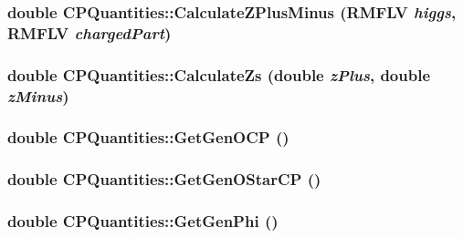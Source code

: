 \label{classCPQuantities_a75ee8a45a17843c7bff05190732a7bb4}
\hypertarget{classCPQuantities_a7bdaec07de8627dd1424946e7776768c}{
\subsubsection[{CalculateZPlusMinus}]{\setlength{\rightskip}{0pt plus 5cm}double CPQuantities::CalculateZPlusMinus (RMFLV {\em higgs}, \/  RMFLV {\em chargedPart})}}
\label{classCPQuantities_a7bdaec07de8627dd1424946e7776768c}
\hypertarget{classCPQuantities_a30852bb8fd044b8b6c979150aa1c5e84}{
\subsubsection[{CalculateZs}]{\setlength{\rightskip}{0pt plus 5cm}double CPQuantities::CalculateZs (double {\em zPlus}, \/  double {\em zMinus})}}
\label{classCPQuantities_a30852bb8fd044b8b6c979150aa1c5e84}
\hypertarget{classCPQuantities_a39840af1718044f5c19a0dbd42d314e7}{
\subsubsection[{GetGenOCP}]{\setlength{\rightskip}{0pt plus 5cm}double CPQuantities::GetGenOCP ()}}
\label{classCPQuantities_a39840af1718044f5c19a0dbd42d314e7}
\hypertarget{classCPQuantities_a2697905dce575b8d56a83e24367cb8b9}{
\subsubsection[{GetGenOStarCP}]{\setlength{\rightskip}{0pt plus 5cm}double CPQuantities::GetGenOStarCP ()}}
\label{classCPQuantities_a2697905dce575b8d56a83e24367cb8b9}
\hypertarget{classCPQuantities_a705bbd0a4e63114d14651656001adff1}{
\subsubsection[{GetGenPhi}]{\setlength{\rightskip}{0pt plus 5cm}double CPQuantities::GetGenPhi ()}}
